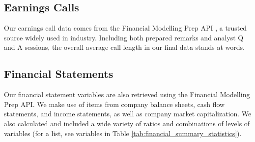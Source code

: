 \documentclass{article}[11pt]
\begin{document}
    \subsection*{Earnings Calls}

    Our earnings call data comes from the Financial Modelling Prep API \citep{financial_modeling_prep_financial_2024}, a trusted source widely used in industry. Including both prepared remarks and analyst Q and A sessions, the overall average call length in our final data stands at \avgCallLength \space words.

    \subsection*{Financial Statements}

    Our financial statement variables are also retrieved using the Financial Modelling Prep API. We make use of items from company balance sheets, cash flow statements, and income statements, as well as company market capitalization. We also calculated and included a wide variety of ratios and combinations of levels of variables (for a list, see variables in Table \ref{tab:financial_summary_statistics}).
\end{document}
